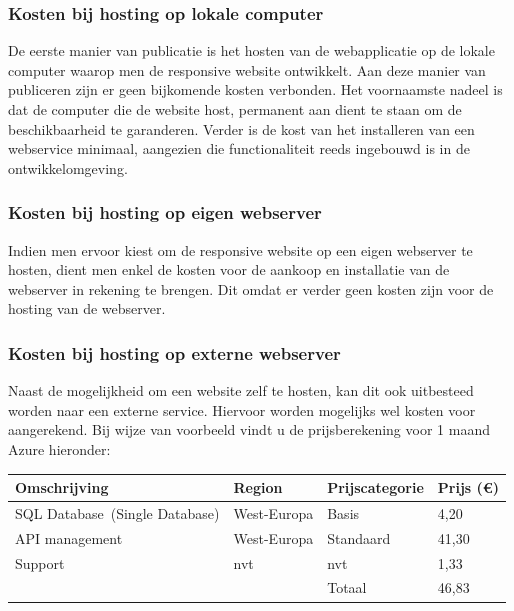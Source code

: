 \subsubsection{Kosten bij hosting op lokale computer}
De eerste manier van publicatie is het hosten van de webapplicatie op de lokale computer waarop men de responsive website
ontwikkelt. Aan deze manier van publiceren zijn er geen bijkomende kosten verbonden. Het voornaamste nadeel is dat de computer
die de website host, permanent aan dient te staan om de beschikbaarheid te garanderen. Verder is de kost van het installeren
van een webservice minimaal, aangezien die functionaliteit reeds ingebouwd is in de ontwikkelomgeving.
\newpage
\subsubsection{Kosten bij hosting op eigen webserver}
Indien men ervoor kiest om de responsive website op een eigen webserver te hosten, dient men enkel de kosten voor de aankoop en installatie van de webserver in rekening te brengen.
Dit omdat er verder geen kosten zijn voor de hosting van de webserver.

\subsubsection{Kosten bij hosting op externe webserver}
Naast de mogelijkheid om een website zelf te hosten, kan dit ook uitbesteed worden naar een externe service.
Hiervoor worden mogelijks wel kosten voor aangerekend. Bij wijze van voorbeeld vindt u de prijsberekening voor 1 maand Azure hieronder:
\begin{center}
  \newline
  \begin{tabular}{ | l | l | l | l |}
  \hline
  Omschrijving & Region & Prijscategorie & Prijs (€)
  \\ \hline
  SQL Database (Single Database) & West-Europa & Basis & 4,20
  \\ \hline
  API management & West-Europa & Standaard & 41,30
  \\ \hline
  Support & nvt & nvt & 1,33
  \\ \hline
   & & Totaal &  46,83
  \\ \hline
  \end{tabular}
\end{center}
